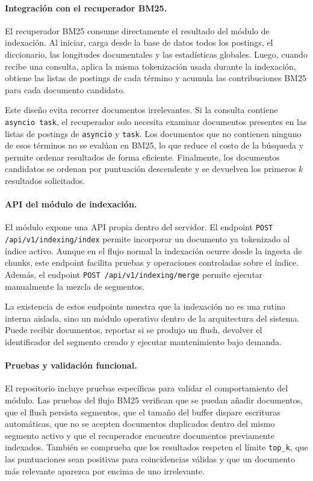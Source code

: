 \documentclass[11pt]{article}
\begin{document}
\paragraph{Integración con el recuperador BM25.}
El recuperador BM25 consume directamente el resultado del módulo de indexación. Al iniciar,
carga desde la base de datos todos los postings, el diccionario, las longitudes documentales y las
estadísticas globales. Luego, cuando recibe una consulta, aplica la misma tokenización usada
durante la indexación, obtiene las listas de postings de cada término y acumula las contribuciones
BM25 para cada documento candidato.

Este diseño evita recorrer documentos irrelevantes. Si la consulta contiene \texttt{asyncio task},
el recuperador solo necesita examinar documentos presentes en las listas de postings de
\texttt{asyncio} y \texttt{task}. Los documentos que no contienen ninguno de esos términos no se
evalúan en BM25, lo que reduce el costo de la búsqueda y permite ordenar resultados de forma
eficiente. Finalmente, los documentos candidatos se ordenan por puntuación descendente y se
devuelven los primeros \(k\) resultados solicitados.

\paragraph{API del módulo de indexación.}
El módulo expone una API propia dentro del servidor. El endpoint
\texttt{POST /api/v1/indexing/index} permite incorporar un documento ya tokenizado al índice
activo. Aunque en el flujo normal la indexación ocurre desde la ingesta de chunks, este endpoint
facilita pruebas y operaciones controladas sobre el índice. Además, el endpoint
\texttt{POST /api/v1/indexing/merge} permite ejecutar manualmente la mezcla de segmentos.

La existencia de estos endpoints muestra que la indexación no es una rutina interna aislada, sino
un módulo operativo dentro de la arquitectura del sistema. Puede recibir documentos, reportar si
se produjo un flush, devolver el identificador del segmento creado y ejecutar mantenimiento bajo
demanda.

\paragraph{Pruebas y validación funcional.}
El repositorio incluye pruebas específicas para validar el comportamiento del módulo. Las pruebas
del flujo BM25 verifican que se puedan añadir documentos, que el flush persista segmentos, que el
tamaño del buffer dispare escrituras automáticas, que no se acepten documentos duplicados dentro
del mismo segmento activo y que el recuperador encuentre documentos previamente indexados.
También se comprueba que los resultados respeten el límite \texttt{top\_k}, que las puntuaciones
sean positivas para coincidencias válidas y que un documento más relevante aparezca por encima de
uno irrelevante.
\end{document}
